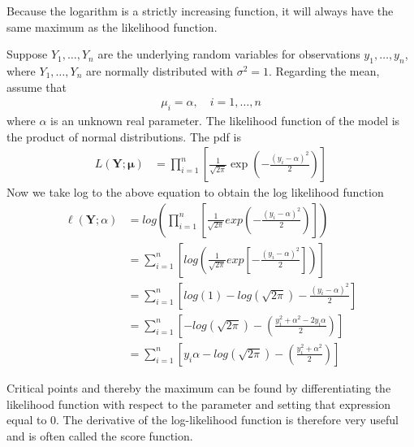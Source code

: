 Because the logarithm is a strictly increasing function, it will always have the same maximum as the likelihood function. 

\begin{example} \label{ex:model1}
Suppose $Y_1,\ldots,Y_n$ are the underlying random variables for observations $y_1,\ldots,y_n$, where $Y_1,\ldots,Y_n$ are normally distributed with $\sigma^2 = 1$. Regarding the mean, assume that
\begin{align*}
    \mu_i = \alpha, \quad i = 1, \ldots,n
\end{align*}
where $\alpha$ is an unknown real parameter. 
The likelihood function of the model is the product of normal distributions. The pdf is 
\begin{align*}
   L(\textbf{Y};\boldsymbol{\mu}) &= \prod_{i=1}^n \left[ \frac{1}{ \sqrt{2 \pi}}\exp\left(-\frac{(y_i -\alpha)^2}{2}\right) \right]
\end{align*}
Now we take log to the above equation to obtain the log likelihood function
\begin{align*}
   \ell(\textbf{Y};\alpha) &= log \left( \prod_{i=1}^n \left[ \frac{1}{\sqrt{2 \pi}}exp\left(-\frac{(y_i -\alpha)^2}{2}\right) \right] \right)\\
   &= \sum_{i = 1}^n \left[ log\left( \frac{1}{\sqrt{2 \pi}}exp\left[-\frac{(y_i - \alpha)^2}{2}\right] \right) \right]\\
   &= \sum_{i = 1}^n \left[ log(1) - log(\sqrt{2 \pi}) - \frac{(y_i - \alpha)^2}{2} \right]\\
   &= \sum_{i = 1}^n \left[- log\left( \sqrt{2 \pi}\right) - \left(\frac{y_i^2 + \alpha^2 - 2y_i\alpha}{2}\right) \right]\\
   &= \sum_{i = 1}^n \left[y_i \alpha - log\left( \sqrt{2 \pi}\right) - \left( \frac{y_i^2 + \alpha^2}{2} \right) \right]
\end{align*}
\end{example}
Critical points and thereby the maximum can be found by differentiating the likelihood function with respect to the parameter and setting that expression equal to 0. The derivative of the log-likelihood function is therefore very useful and is often called the score function. 
